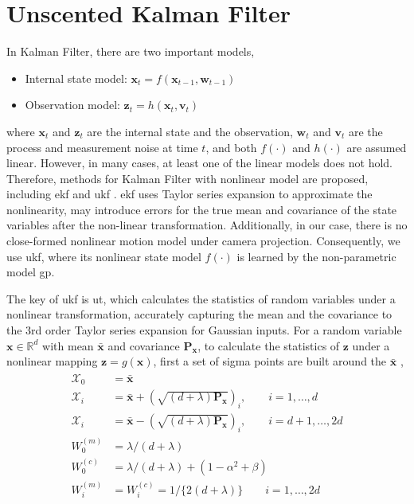 \section{Unscented Kalman Filter}
In Kalman Filter, there are two important models, 
\begin{itemize}
\item Internal state model: $\mathbf{x}_t = f(\mathbf{x}_{t-1}, \mathbf{w}_{t-1})$
\item Observation model: $\mathbf{z}_t = h(\mathbf{x}_t, \mathbf{v}_t)$
\end{itemize}
where $\mathbf{x}_t$ and $\mathbf{z}_t$ are the internal state and the observation,
$\mathbf{w}_t$ and $\mathbf{v}_t$ are the process and measurement noise at time $t$, 
and both $f(\cdot)$ and $h(\cdot)$ are assumed linear. 
However, in many cases, at least one of the linear models does not hold. Therefore, methods for Kalman Filter with nonlinear model are proposed, including \gls{ekf} \cite{julier1997new} and \gls{ukf} \cite{wan2000unscented}. 
\gls{ekf} uses Taylor series expansion to approximate the nonlinearity, may introduce errors for the true mean and covariance of the state variables after the non-linear transformation.
Additionally, in our case, there is no close-formed nonlinear motion model under camera projection. 
Consequently, we use \gls{ukf}, where its nonlinear state model $f(\cdot)$ is learned by the non-parametric model \gls{gp}.



The key of \gls{ukf} is \gls{ut}, which calculates the statistics of random variables under a nonlinear transformation, accurately capturing the mean and the covariance to the 3rd order Taylor series expansion for Gaussian inputs. 
For a random variable $\mathbf{x} \in \mathbb{R}^{d}$ with mean $\bar{\mathbf{x}}$ and covariance $\mathbf{P_x}$, to calculate the statistics of $\mathbf{z}$ under a nonlinear mapping $\mathbf{z} = g(\mathbf{x})$, first a set of sigma points are built around the $\bar{\mathbf{x}}$ \cite{wan2000unscented},
\begin{align}
\begin{split}
\mathcal{X}_0 & = \bar{\mathbf{x}} \\
\mathcal{X}_i & = \bar{\mathbf{x}} + (\sqrt{(d+\lambda)\mathbf{P_x}})_i, \qquad i = 1, \dots, d\\
\mathcal{X}_i & = \bar{\mathbf{x}} - (\sqrt{(d+\lambda)\mathbf{P_x}})_i, \qquad i = d+1, \dots, 2d\\
W_0^{(m)} & = \lambda/(d+\lambda) \\
W_0^{(c)} & = \lambda/(d+\lambda) + (1-\alpha^2+\beta) \\
W_i^{(m)} & = W_i^{(c)} = 1/\{2(d+\lambda)\} \qquad i = 1, \dots, 2d
\end{split}
\end{align}

